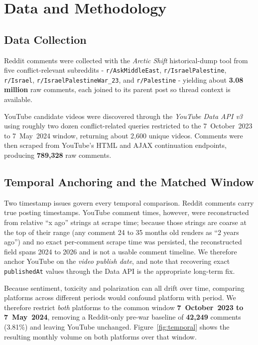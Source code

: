 \section{Data and Methodology}
\label{sec:data}
\subsection{Data Collection}
Reddit comments were collected with the \textit{Arctic Shift} historical-dump tool
from five conflict-relevant subreddits - \texttt{r/AskMiddleEast},
\texttt{r/IsraelPalestine}, \texttt{r/Israel}, \texttt{r/IsraelPalestineWar\_23},
and \texttt{r/Palestine} - yielding about \textbf{3.08 million} raw comments, each
joined to its parent post so thread context is available.

YouTube candidate videos were discovered through the \textit{YouTube Data API v3}
using roughly two dozen conflict-related queries restricted to the
7~October~2023 to 7~May~2024 window, returning about 2{,}600 unique videos. Comments
were then scraped from YouTube's HTML and AJAX continuation endpoints, producing
\textbf{789{,}328} raw comments.

\subsection{Temporal Anchoring and the Matched Window}
Two timestamp issues govern every temporal comparison. Reddit comments carry true
posting timestamps. YouTube comment times, however, were reconstructed from relative
``x ago'' strings at scrape time; because those strings are coarse at the top of
their range (any comment 24 to 35 months old renders as ``2 years ago'') and no exact
per-comment scrape time was persisted, the reconstructed field spans 2024 to 2026 and
is not a usable comment timeline. We therefore anchor YouTube on the \emph{video
publish date}, and note that recovering exact \texttt{publishedAt} values through the
Data API is the appropriate long-term fix.

Because sentiment, toxicity and polarization can all drift over time, comparing
platforms across different periods would confound platform with period. We therefore
restrict \emph{both} platforms to the common window
\textbf{7~October~2023 to 7~May~2024}, removing a Reddit-only pre-war baseline of
\textbf{42{,}249} comments (3.81\%) and leaving YouTube unchanged. Figure~\ref{fig:temporal} shows
the resulting monthly volume on both platforms over that window.

